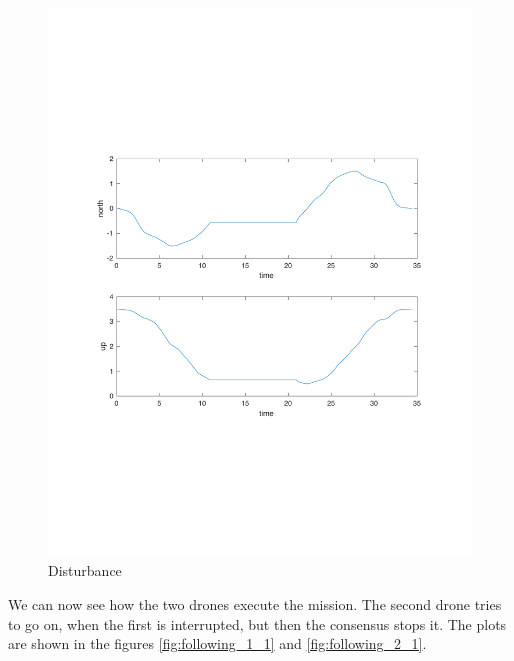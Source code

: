 \begin{figure}[h]
\centering
\includegraphics[width=1.0\textwidth]{chapters/chapter-04/figures/pos_1.pdf}
\caption{Disturbance}
\label{fig:disturbance}
\end{figure}

We can now see how the two drones execute the mission. The second drone tries to
go on, when the first is interrupted, but then the consensus stops it. The plots are
shown in the figures \ref{fig:following_1_1} and \ref{fig:following_2_1}.

